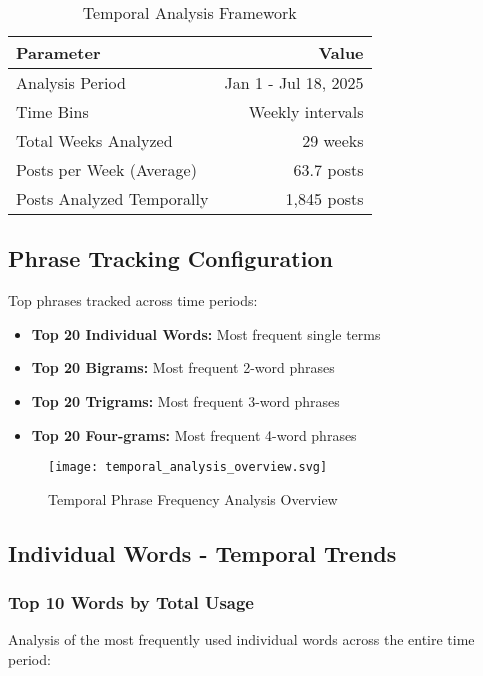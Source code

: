 \documentclass[12pt,a4paper]{article}
\begin{document}
\begin{table}[H]
\centering
\caption{Temporal Analysis Framework}
\begin{tabular}{@{}lr@{}}
\toprule
\textbf{Parameter} & \textbf{Value} \\
\midrule
Analysis Period & Jan 1 - Jul 18, 2025 \\
Time Bins & Weekly intervals \\
Total Weeks Analyzed & 29 weeks \\
Posts per Week (Average) & 63.7 posts \\
Posts Analyzed Temporally & 1,845 posts \\
\bottomrule
\end{tabular}
\end{table}

\subsection{Phrase Tracking Configuration}

Top phrases tracked across time periods:
\begin{itemize}
\item \textbf{Top 20 Individual Words:} Most frequent single terms
\item \textbf{Top 20 Bigrams:} Most frequent 2-word phrases
\item \textbf{Top 20 Trigrams:} Most frequent 3-word phrases  
\item \textbf{Top 20 Four-grams:} Most frequent 4-word phrases
\end{itemize}

\begin{figure}[H]
\centering
\texttt{[image: temporal\_analysis\_overview.svg]}
\caption{Temporal Phrase Frequency Analysis Overview}
\label{fig:temporal_overview}
\end{figure}

\subsection{Individual Words - Temporal Trends}

\subsubsection{Top 10 Words by Total Usage}

Analysis of the most frequently used individual words across the entire time period:
\end{document}

